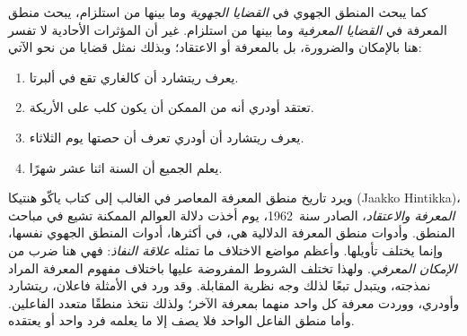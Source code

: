 \documentclass[../../../include/open-logic-section]{subfiles}
\begin{document}


كما يبحث المنطق الجهوي في \emph{القضايا الجهوية} وما بينها من استلزام، يبحث
منطق المعرفة في \emph{القضايا المعرفية} وما بينها من استلزام. غير أن
المؤثرات الأحادية لا تفسر هنا بالإمكان والضرورة، بل بالمعرفة أو الاعتقاد؛
وبذلك نمثل قضايا من نحو الآتي:

\begin{enumerate}
\item يعرف ريتشارد أن كالغاري تقع في ألبرتا.
\item تعتقد أودري أنه من الممكن أن يكون كلب على الأريكة.
\item يعرف ريتشارد أن أودري تعرف أن حصتها يوم الثلاثاء.
\item يعلم الجميع أن السنة اثنا عشر شهرًا.
\end{enumerate}
ويرد تاريخ منطق المعرفة المعاصر في الغالب إلى كتاب ياكّو هنتيكا
(Jaakko Hintikka)،
\emph{المعرفة والاعتقاد}، الصادر سنة~1962، يوم أخذت دلالة العوالم الممكنة
تشيع في مباحث المنطق. وأدوات منطق المعرفة الدلالية هي، في أكثرها، أدوات
المنطق الجهوي نفسها، وإنما يختلف تأويلها. وأعظم مواضع الاختلاف ما تمثله
\emph{علاقة النفاذ}: فهي هنا ضرب من \emph{الإمكان المعرفي}. ولهذا تختلف
الشروط المفروضة عليها باختلاف مفهوم المعرفة المراد نمذجته، ويتبدل تبعًا
لذلك وجه نظرية المقابلة. وقد ورد في الأمثلة فاعلان، ريتشارد وأودري، ووردت
معرفة كل واحد منهما بمعرفة الآخر؛ ولذلك نتخذ منطقًا متعدد الفاعلين. وأما
منطق الفاعل الواحد فلا يصف إلا ما يعلمه فرد واحد أو يعتقده.
\end{document}
